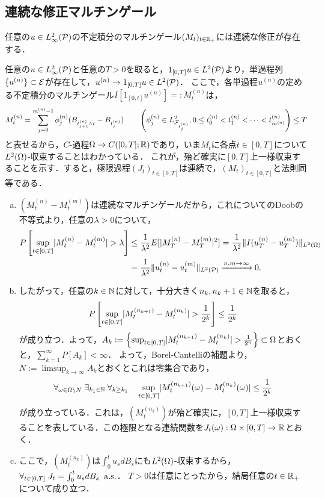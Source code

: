\documentclass[uplatex,dvipdfmx]{jsreport}
\begin{document}
\subsection{連続な修正マルチンゲール}

\begin{proposition}[$C$-過程と法則同等]
    任意の$u\in L^2_\infty(\P)$の不定積分のマルチンゲール$(M_t)_{t\in\R_+}$には連続な修正が存在する．
\end{proposition}
\begin{Proof}
    任意の$u\in L^2_\infty(\P)$と任意の$T>0$を取ると，$1_{[0,T]}u\in L^2(\P)$より，単過程列$\{u^{(n)}\}\subset\E$が存在して，$u^{(n)}\to 1_{[0,T]}u\in L^2(\P)$．
    ここで，各単過程$u^{(n)}$の定める不定積分のマルチンゲール$I[1_{[0,t]}u^{(n)}]=:M_t^{(n)}$は，
    \[M^{(n)}_t=\sum_{j=0}^{m^{(n)}-1}\phi_j^{(n)}(B_{t_{j+1}^{(n)}\land t}-B_{t_j^{(n)}})\qquad\paren{\phi_j^{(n)}\in L^2_{\F_{t_j^{(n)}}},0\le t_0^{(n)}<t_1^{(n)}<\cdots<t_{m^{(n)}}^{(n)}}\le T\]
    と表せるから，$C$-過程$\Om\to C([0,T];\R)$であり，いま$M_t$に各点$t\in[0,T]$について$L^2(\Om)$-収束することはわかっている．
    これが，殆ど確実に$[0,T]$上一様収束することを示す．すると，極限過程$(J_t)_{t\in[0,T]}$は連続で，$(M_t)_{t\in[0,T]}$と法則同等である．
    \begin{enumerate}[(a)]
        \item $(M_t^{(n)}-M_t^{(m)})$は連続なマルチンゲールだから，これについてのDoobの不等式より，任意の$\lambda>0$について，
        \begin{align*}
            P\Square{\sup_{t\in[0,T]}\abs{M_t^{(n)}-M_t^{(m)}}>\lambda}&\le\frac{1}{\lambda^2}E[\abs{M^{(n)}_T-M^{(m)}_T}^2]=\frac{1}{\lambda^2}\norm{I(u^{(n)}_T-u^{(m)}_T)}_{L^2(\Om)}\\
            &=\frac{1}{\lambda^2}\norm{u^{(n)}_t-u^{(m)}_t}_{L^2(\P)}\xrightarrow{n,m\to\infty}0.
        \end{align*}
        \item したがって，任意の$k\in\N$に対して，十分大きく$n_k,n_k+1\in\N$を取ると，
        \[P\Square{\sup_{t\in[0,T]}\abs{M_t^{(n_{k+1})}-M_t^{(n_k)}}>\frac{1}{2^k}}\le\frac{1}{2^k}\]
        が成り立つ．よって，$A_k:=\Brace{\sup_{t\in[0,T]}\abs{M_t^{(n_{k+1})}-M_t^{(n_k)}}>\frac{1}{2^n}}\subset\Om$とおくと，$\sum^\infty_{k=1}P[A_k]<\infty$．
        よって，Borel-Cantelliの補題より，$N:=\limsup_{k\to\infty}A_k$とおくとこれは零集合であり，
        \[\forall_{\om\in\Om\setminus N}\;\exists_{k_1\in\N}\;\forall_{k\ge k_1}\quad\sup_{t\in[0,T]}\abs{M_t^{(n_{k+1})}(\om)-M_t^{(n_k)}(\om)}\le\frac{1}{2^k}\]
        が成り立っている．これは，$(M_t^{(n_k)})$が殆ど確実に，$[0,T]$上一様収束することを表している．この極限となる連続関数を$J_t(\om):\Om\times[0,T]\to\R$とおく．
        \item ここで，$(M_t^{(n_k)})$は$\int^t_0u_sdB_s$にも$L^2(\Om)$-収束するから，$\forall_{t\in[0,T]}\;J_t=\int^t_0u_sdB_s\;\as$．
        $T>0$は任意にとったから，結局任意の$t\in\R_+$について成り立つ．
    \end{enumerate}
\end{Proof}
\end{document}
